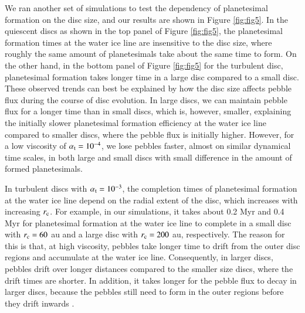 \documentclass{aa}
\begin{document}
We ran another set of simulations to test the dependency of planetesimal formation on the disc size, and our results are shown in Figure \ref{fig:fig5}. In the  quiescent discs as shown in the top panel of Figure \ref{fig:fig5}, the planetesimal formation times at the water ice line are insensitive to the disc size, where roughly the same amount of planetesimals take about the same time to form. On the other hand, in the bottom panel of Figure \ref{fig:fig5} for the turbulent disc, planetesimal formation takes longer time in a large disc compared to a small disc. 
These observed trends can best be explained by how the disc size affects pebble flux during the course of disc evolution. In large discs, we can maintain pebble flux for a longer time than in small discs, which is, however, smaller, explaining the initially slower planetesimal formation efficiency at the water ice line compared to smaller discs, where the pebble flux is initially higher. However, for a low viscosity of $\alpha_{\rm t}=10^{-4}$, we lose pebbles faster, almost on similar dynamical time scales, in both large and small discs with small difference in the amount of formed planetesimals.



In turbulent discs with $\alpha_{\rm t}=10^{-3}$, the completion times of planetesimal formation at the water ice line depend on the radial extent of the disc, which increases with increasing $r_{\rm c}$. For example, in our simulations, it takes about 0.2 Myr  and  0.4 Myr for planetesimal formation at the water ice line to complete in a small disc with $r_{\rm c}=60$ au and a large disc with $r_{\rm c}=200$ au, respectively. The reason for this is that, at high viscosity, pebbles take longer time to drift from the outer disc regions and accumulate at the water ice line. Consequently, in larger discs, pebbles drift over longer distances compared to the smaller size discs, where the drift times are shorter. In addition, it takes longer for the pebble flux to decay in larger discs, because the pebbles still need to form in the outer regions before they drift inwards \citep{LambrechtsJohansen2014, Bitsch2018, BitschMah2023}. 
\end{document}
